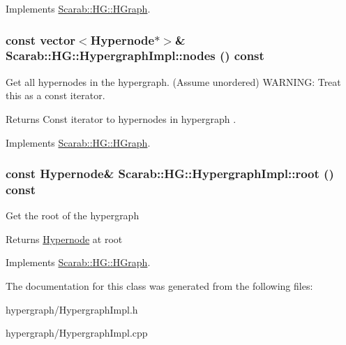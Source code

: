 Implements \hyperlink{classScarab_1_1HG_1_1HGraph_a57328729f90cc4152ca79ff15ecdd4bb}{Scarab::HG::HGraph}.

\hypertarget{classScarab_1_1HG_1_1HypergraphImpl_a9aef2881b489c86d4d83e996a70f8141}{
\subsubsection[{nodes}]{\setlength{\rightskip}{0pt plus 5cm}const vector$<${\bf Hypernode}$\ast$$>$\& Scarab::HG::HypergraphImpl::nodes () const}}
\label{classScarab_1_1HG_1_1HypergraphImpl_a9aef2881b489c86d4d83e996a70f8141}
Get all hypernodes in the hypergraph. (Assume unordered) WARNING: Treat this as a const iterator. \begin{DoxyReturn}{Returns}
Const iterator to hypernodes in hypergraph . 
\end{DoxyReturn}


Implements \hyperlink{classScarab_1_1HG_1_1HGraph_a74d893fba015520774f71f02a46bb6ca}{Scarab::HG::HGraph}.

\hypertarget{classScarab_1_1HG_1_1HypergraphImpl_a31172009b97d179f6b1199f191197a32}{
\subsubsection[{root}]{\setlength{\rightskip}{0pt plus 5cm}const {\bf Hypernode}\& Scarab::HG::HypergraphImpl::root () const}}
\label{classScarab_1_1HG_1_1HypergraphImpl_a31172009b97d179f6b1199f191197a32}
Get the root of the hypergraph

\begin{DoxyReturn}{Returns}
\hyperlink{classScarab_1_1HG_1_1Hypernode}{Hypernode} at root 
\end{DoxyReturn}


Implements \hyperlink{classScarab_1_1HG_1_1HGraph_a5ede392b158e41dd7e95ded1c4b0b5d6}{Scarab::HG::HGraph}.



The documentation for this class was generated from the following files:\begin{DoxyCompactItemize}
\item 
hypergraph/HypergraphImpl.h\item 
hypergraph/HypergraphImpl.cpp\end{DoxyCompactItemize}
